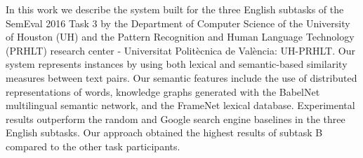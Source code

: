 In this work we describe the system built for the three English subtasks of the SemEval 2016 Task 3 by the Department of Computer Science of the University of Houston (UH) and the Pattern Recognition and Human Language Technology (PRHLT) research center - Universitat Politècnica de València: UH-PRHLT. Our system represents instances by using both lexical and semantic-based similarity measures between text pairs. Our semantic features include the use of distributed representations of words, knowledge graphs generated with the BabelNet multilingual semantic network, and the FrameNet lexical database. Experimental results outperform the random and Google search engine baselines in the three English subtasks. Our approach obtained the highest results of subtask B compared to the other task participants.

